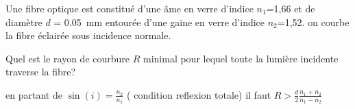 \begin{Exercise}[title=Courbure de fibre optique]
Une fibre optique est constitué d'une âme en verre d'indice $n_1$=1,66 et de diamètre $d$ = \SI{0.05}{\mm} entourée d'une gaine en verre d'indice $n_2$=1,52. on courbe la fibre éclairée sous incidence normale.
\begin{center}
	
\end{center}
\Question Quel est le rayon de courbure $R$ minimal pour lequel toute la lumière incidente traverse la fibre?
\end{Exercise}
\begin{Answer}
en partant de $\sin(i) = \frac{n_2}{n_1}$ ( condition reflexion totale)
il faut $R > \frac{d}{2}\frac{n_1+n_2}{n_1-n_2}$
\begin{center}

\end{center}
\end{Answer}
